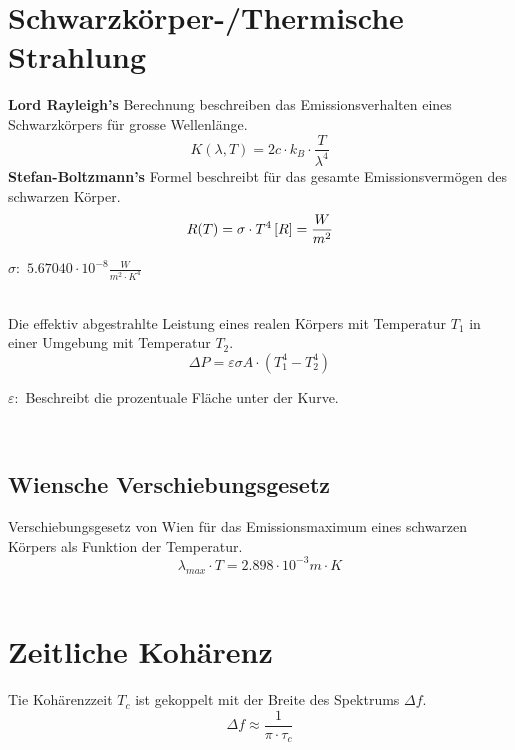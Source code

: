 \section{Schwarzkörper-/Thermische Strahlung}
\textbf{Lord Rayleigh's} Berechnung beschreiben das Emissionsverhalten eines Schwarzkörpers für grosse Wellenlänge.\
\[
	K(\lambda,T)=2c \cdot k_B\cdot \frac{T}{\lambda^4}
\]
\textbf{Stefan-Boltzmann's} Formel beschreibt für das gesamte Emissionsvermögen des schwarzen Körper.\
\[
	R(T)=\sigma \cdot T^4 
	\\ \left[ R\right]  =\frac{W}{m^2} \\ \\
\]
\begin{footnotesize}
	$\sigma:$	$5.67040 \cdot 10^{-8} \frac{W}{m^2\cdot K^4}$ \\
\end{footnotesize}
\\
Die effektiv abgestrahlte Leistung eines realen Körpers mit Temperatur $T_1$ in einer Umgebung mit Temperatur $T_2$.\
\[
	\Delta P = \varepsilon \sigma A\cdot (T_1^4-T_2^4)
\]
\begin{footnotesize}
	$\varepsilon:$	Beschreibt die prozentuale Fläche unter der Kurve. \\
\end{footnotesize}
\\
\subsection{Wiensche Verschiebungsgesetz}
Verschiebungsgesetz von Wien für das Emissionsmaximum eines schwarzen Körpers als Funktion der Temperatur.\
\[
	\lambda_{max} \cdot T = 2.898 \cdot 10^{-3}m\cdot K
\]
\\
\section{Zeitliche Kohärenz}
Tie Kohärenzzeit $T_c$ ist gekoppelt mit der Breite des Spektrums $\Delta f$.\
\[
	\Delta f \approx \frac{1}{\pi\cdot \tau_c}
\]